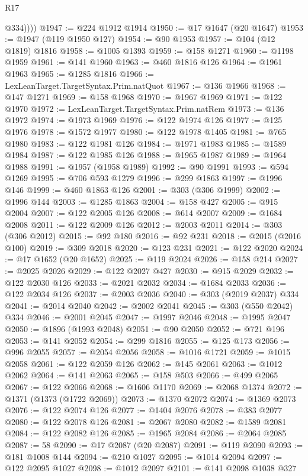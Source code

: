 \begin{lexlean}{R17}
\begin{coremodule}
            @334))))
@1947 := @224 @1912 @1914
@1950 := @17 @1647 (@20 @1647)
@1953 := @1947 (@119 @1950 @127)
@1954 := @90 @1953
@1957 := @104 (@12 @1819) @1816
@1958 := @1005 @1393
@1959 := @158 @1271
@1960 := @1198 @1959
@1961 := @141 @1960
@1963 := @460 @1816 @126
@1964 := @1961 @1963
@1965 := @1285 @1816
@1966 := LexLeanTarget.TargetSyntax.Prim.natQuot
@1967 := @136 @1966
@1968 := @147 @1271
@1969 := @158 @1968
@1970 := @1967 @1969
@1971 := @122 @1970
@1972 := LexLeanTarget.TargetSyntax.Prim.natRem
@1973 := @136 @1972
@1974 := @1973 @1969
@1976 := @122 @1974 @126
@1977 := @125 @1976
@1978 := @1572 @1977
@1980 := @122 @1978 @1405
@1981 := @765 @1980
@1983 := @122 @1981 @126
@1984 := @1971 @1983
@1985 := @1589 @1984
@1987 := @122 @1985 @126
@1988 := @1965 @1987
@1989 := @1964 @1988
@1991 := @1957 (@1958 @1989)
@1992 := @90 @1991
@1993 := @594 @1269
@1995 := @706 @593 @1279
@1996 := @299 @1863
@1997 := @1996 @146
@1999 := @460 @1863 @126
@2001 := @303 (@306 @1999)
@2002 := @1996 @144
@2003 := @1285 @1863
@2004 := @158 @427
@2005 := @915 @2004
@2007 := @122 @2005 @126
@2008 := @614 @2007
@2009 := @1684 @2008
@2011 := @122 @2009 @126
@2012 := @2003 @2011
@2014 := @303 (@306 @2012)
@2015 := @92 @180
@2016 := @92 @231
@2018 := @2015 (@2016 @100)
@2019 := @309 @2018
@2020 := @123 @231
@2021 := @122 @2020
@2024 := @17 @1652 (@20 @1652)
@2025 := @119 @2024
@2026 := @158 @214
@2027 := @2025 @2026
@2029 := @122 @2027 @427
@2030 := @915 @2029
@2032 := @122 @2030 @126
@2033 := @2021 @2032
@2034 := @1684 @2033
@2036 := @122 @2034 @126
@2037 := @2003 @2036
@2040 := @303 (@2019 @2037) @334
@2041 := @2014 @2040
@2042 := @2002 @2041
@2045 := @303 (@550 @2042) @334
@2046 := @2001 @2045
@2047 := @1997 @2046
@2048 := @1995 @2047
@2050 := @1896 (@1993 @2048)
@2051 := @90 @2050
@2052 := @721 @196
@2053 := @141 @2052
@2054 := @299 @1816
@2055 := @125 @173
@2056 := @996 @2055
@2057 := @2054 @2056
@2058 := @1016 @1721
@2059 := @1015 @2058
@2061 := @122 @2059 @126
@2062 := @145 @2061
@2063 := @1012 @2062
@2064 := @141 @2063
@2065 := @158 @503
@2066 := @499 @2065
@2067 := @122 @2066
@2068 := @1606 @1170
@2069 := @2068 @1374
@2072 := @1371 (@1373 (@1722 @2069))
@2073 := @1370 @2072
@2074 := @1369 @2073
@2076 := @122 @2074 @126
@2077 := @1404 @2076
@2078 := @383 @2077
@2080 := @122 @2078 @126
@2081 := @2067 @2080
@2082 := @1589 @2081
@2084 := @122 @2082 @126
@2085 := @1965 @2084
@2086 := @2064 @2085
@2087 := 58
@2090 := @17 @2087 (@20 @2087)
@2091 := @119 @2090
@2093 := @181 @1008 @144
@2094 := @210 @1027
@2095 := @1014 @2094
@2097 := @122 @2095 @1027
@2098 := @1012 @2097
@2101 := @141 @2098 @1038 @327

\end{coremodule}
\end{lexlean}

